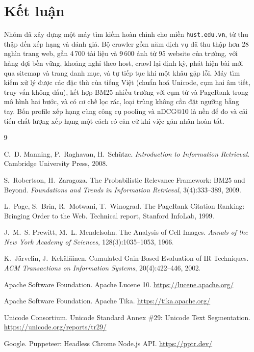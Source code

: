 \documentclass[12pt,a4paper]{report}
\begin{document}
\section{Kết luận}

Nhóm đã xây dựng một máy tìm kiếm hoàn chỉnh cho miền \texttt{hust.edu.vn}, từ thu thập đến xếp hạng và đánh giá. Bộ
crawler gồm năm dịch vụ đã thu thập hơn 28 nghìn trang web, gần 4\,700 tài liệu và 9\,600 ảnh từ 95 website của trường,
với hàng đợi bền vững, khoảng nghỉ theo host, crawl lại định kỳ, phát hiện bài mới qua sitemap và trang danh mục, và tự tiếp tục khi một khâu gặp lỗi. Máy tìm kiếm xử lý
được các đặc thù của tiếng Việt (chuẩn hoá Unicode, cụm hai âm tiết, truy vấn không dấu), kết hợp BM25 nhiều trường với
cụm từ và PageRank trong mô hình hai bước, và có cơ chế lọc rác, loại trùng không cần đặt ngưỡng bằng tay. Bốn profile
xếp hạng cùng công cụ pooling và nDCG@10 là nền để đo và cải tiến chất lượng xếp hạng một cách có căn cứ khi việc gán
nhãn hoàn tất.

\begin{thebibliography}{9}

C.~D. Manning, P.~Raghavan, H.~Schütze.
\newblock \emph{Introduction to Information Retrieval}.
\newblock Cambridge University Press, 2008.

S.~Robertson, H.~Zaragoza.
\newblock The Probabilistic Relevance Framework: BM25 and Beyond.
\newblock \emph{Foundations and Trends in Information Retrieval}, 3(4):333--389, 2009.

L.~Page, S.~Brin, R.~Motwani, T.~Winograd.
\newblock The PageRank Citation Ranking: Bringing Order to the Web.
\newblock Technical report, Stanford InfoLab, 1999.

J.~M.~S. Prewitt, M.~L. Mendelsohn.
\newblock The Analysis of Cell Images.
\newblock \emph{Annals of the New York Academy of Sciences}, 128(3):1035--1053, 1966.

K.~Järvelin, J.~Kekäläinen.
\newblock Cumulated Gain-Based Evaluation of IR Techniques.
\newblock \emph{ACM Transactions on Information Systems}, 20(4):422--446, 2002.

Apache Software Foundation.
\newblock Apache Lucene 10. \url{https://lucene.apache.org/}

Apache Software Foundation.
\newblock Apache Tika. \url{https://tika.apache.org/}

Unicode Consortium.
\newblock Unicode Standard Annex \#29: Unicode Text Segmentation. \url{https://unicode.org/reports/tr29/}

Google.
\newblock Puppeteer: Headless Chrome Node.js API. \url{https://pptr.dev/}

\end{thebibliography}
\end{document}
